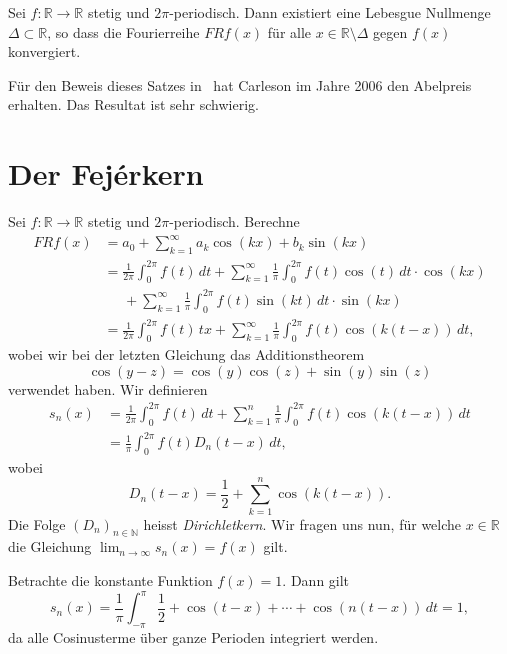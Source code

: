 \documentclass[../main.tex]{subfiles}
\begin{document}
\begin{theorem}[Carleson 1966]
   Sei $f \colon \mathbb{R} \to \mathbb{R}$ 
   stetig und $2\pi$-periodisch.
   Dann existiert eine Lebesgue Nullmenge
   $\Delta \subset \mathbb{R}$, so dass die Fourierreihe
   $FRf(x)$ für alle $x \in \mathbb{R} \setminus \Delta$ 
   gegen $f(x)$ konvergiert.
\end{theorem}

Für den Beweis dieses Satzes in~\cite{carleson}
hat Carleson im Jahre 2006 den Abelpreis erhalten.
Das Resultat ist sehr schwierig.

\section{Der Fejérkern}
Sei $f \colon \mathbb{R} \to \mathbb{R}$ stetig
und $2\pi$-periodisch.
Berechne
\begin{align*}
  FRf(x)
  & = a_0 + \sum_{k=1}^{\infty} a_k \cos(kx) + b_k \sin(kx)\\
  & = \frac{1}{2\pi} \int_{0}^{2\pi} f(t) \, dt +
  \sum_{k=1}^{\infty} \frac{1}{\pi}\int_{0}^{2\pi} 
  f(t) \cos(t) \, dt
  \cdot \cos(kx) \\
  &\;\;\;\;\; + \sum_{k=1}^{\infty} \frac{1}{\pi} \int_{0}^{2\pi} 
  f(t) \sin(kt)\, dt \cdot \sin(kx)\\
  &= \frac{1}{2\pi} \int_{0}^{2\pi} f(t) \, tx
  + \sum_{k=1}^{\infty} \frac{1}{\pi} \int_{0}^{2\pi} 
  f(t) \cos(k(t-x))\, dt,
\end{align*}
wobei wir bei der letzten Gleichung das Additionstheorem
\[
  \cos(y - z) = \cos(y) \cos(z) + \sin(y) \sin(z)
\]
verwendet haben.
Wir definieren
\begin{align*}
 s_n(x) 
 & = \frac{1}{2\pi} \int_{0}^{2\pi} f(t) \, dt
  + \sum_{k=1}^{n} \frac{1}{\pi}
  \int_{0}^{2\pi} f(t) \cos(k(t-x)) \, dt \\
 &= \frac{1}{\pi} \int_{0}^{2\pi} f(t) D_n(t - x) \, dt,
\end{align*}
wobei
\[
  D_n(t - x) = \frac{1}{2} + \sum_{k=1}^{n} \cos(k(t-x)).
\]
Die Folge ${(D_{n})}_{n \in \mathbb{N}}$ heisst
\emph{Dirichletkern}.
Wir fragen uns nun,
für welche $x \in \mathbb{R}$ die Gleichung
\(
  \lim_{n \to \infty} s_n(x) = f(x)
\)
gilt.

\begin{example}
  Betrachte die konstante Funktion $f(x) = 1$.
  Dann gilt
  \[
    s_n (x) = \frac{1}{\pi} \int_{-\pi}^{\pi} \frac{1}{2} + \cos(t - x) + \cdots +
    \cos(n(t-x))\, dt = 1,
  \]
  da alle Cosinusterme über ganze Perioden integriert werden.
\end{example}
\end{document}
